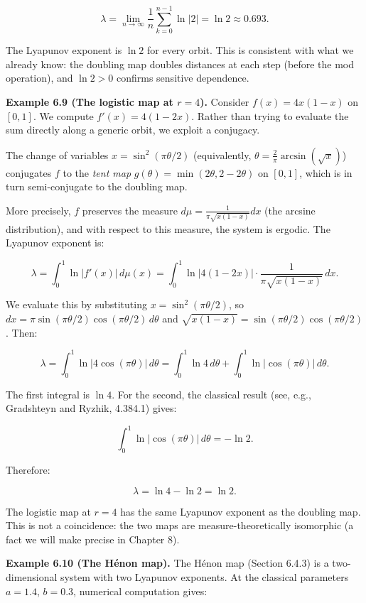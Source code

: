 \[
\lambda = \lim_{n \to \infty} \frac{1}{n} \sum_{k=0}^{n-1} \ln|2| = \ln 2 \approx 0.693.
\]

The Lyapunov exponent is $\ln 2$ for every orbit. This is consistent with what we already know: the doubling map doubles distances at each step (before the mod operation), and $\ln 2 > 0$ confirms sensitive dependence.

\textbf{Example 6.9 (The logistic map at $r = 4$).} Consider $f(x) = 4x(1-x)$ on $[0,1]$. We compute $f'(x) = 4(1-2x)$. Rather than trying to evaluate the sum directly along a generic orbit, we exploit a conjugacy.

The change of variables $x = \sin^2(\pi\theta/2)$ (equivalently, $\theta = \frac{2}{\pi}\arcsin(\sqrt{x})$) conjugates $f$ to the \textit{tent map} $g(\theta) = \min(2\theta, 2-2\theta)$ on $[0,1]$, which is in turn semi-conjugate to the doubling map.

More precisely, $f$ preserves the measure $d\mu = \frac{1}{\pi\sqrt{x(1-x)}} dx$ (the arcsine distribution), and with respect to this measure, the system is ergodic. The Lyapunov exponent is:

\[
\lambda = \int_0^1 \ln|f'(x)| \, d\mu(x) = \int_0^1 \ln|4(1-2x)| \cdot \frac{1}{\pi\sqrt{x(1-x)}} \, dx.
\]

We evaluate this by substituting $x = \sin^2(\pi\theta/2)$, so $dx = \pi\sin(\pi\theta/2)\cos(\pi\theta/2) \, d\theta$ and $\sqrt{x(1-x)} = \sin(\pi\theta/2)\cos(\pi\theta/2)$. Then:

\[
\lambda = \int_0^1 \ln|4\cos(\pi\theta)| \, d\theta = \int_0^1 \ln 4 \, d\theta + \int_0^1 \ln|\cos(\pi\theta)| \, d\theta.
\]

The first integral is $\ln 4$. For the second, the classical result (see, e.g., Gradshteyn and Ryzhik, 4.384.1) gives:

\[
\int_0^1 \ln|\cos(\pi\theta)| \, d\theta = -\ln 2.
\]

Therefore:

\[
\lambda = \ln 4 - \ln 2 = \ln 2.
\]

The logistic map at $r = 4$ has the same Lyapunov exponent as the doubling map. This is not a coincidence: the two maps are measure-theoretically isomorphic (a fact we will make precise in Chapter 8).

\textbf{Example 6.10 (The Hénon map).} The Hénon map (Section 6.4.3) is a two-dimensional system with two Lyapunov exponents. At the classical parameters $a = 1.4$, $b = 0.3$, numerical computation gives:

